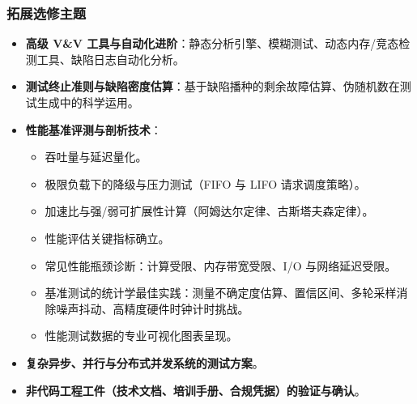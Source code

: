 \subsubsection{拓展选修主题}
\begin{itemize}
    \item \textbf{高级 V\&V 工具与自动化进阶}：静态分析引擎、模糊测试、动态内存/竞态检测工具、缺陷日志自动化分析。
    \item \textbf{测试终止准则与缺陷密度估算}：基于缺陷播种的剩余故障估算、伪随机数在测试生成中的科学运用。
    \item \textbf{性能基准评测与剖析技术}：
    \begin{itemize}
        \item 吞吐量与延迟量化。
        \item 极限负载下的降级与压力测试（FIFO 与 LIFO 请求调度策略）。
        \item 加速比与强/弱可扩展性计算（阿姆达尔定律、古斯塔夫森定律）。
        \item 性能评估关键指标确立。
        \item 常见性能瓶颈诊断：计算受限、内存带宽受限、I/O 与网络延迟受限。
        \item 基准测试的统计学最佳实践：测量不确定度估算、置信区间、多轮采样消除噪声抖动、高精度硬件时钟计时挑战。
        \item 性能测试数据的专业可视化图表呈现。
    \end{itemize}
    \item \textbf{复杂异步、并行与分布式并发系统的测试方案}。
    \item \textbf{非代码工程工件（技术文档、培训手册、合规凭据）的验证与确认}。
\end{itemize}

